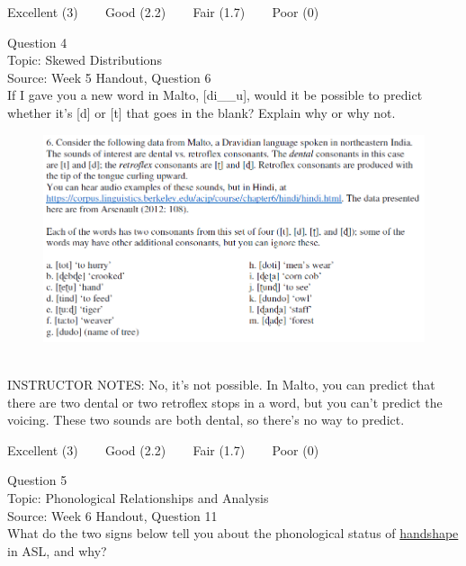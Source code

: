 \documentclass[12pt]{article}
\begin{document}
\vfill
Excellent (3) ~~~ Good (2.2) ~~~ Fair (1.7) ~~~ Poor (0)
\newpage

{\large Question 4}\\

Topic: Skewed Distributions\\
Source: Week 5 Handout, Question 6\\

If I gave you a new word in Malto, [di\_\_u], would it be possible to predict whether it's [d] or [t] that goes in the blank? Explain why or why not.\\

\begin{figure}[H]
\includegraphics{../images/malto.png}
\end{figure}

~\\
INSTRUCTOR NOTES: No, it's not possible. In Malto, you can predict that there are two dental or two retroflex stops in a word, but you can't predict the voicing. These two sounds are both dental, so there's no way to predict.


\vfill
Excellent (3) ~~~ Good (2.2) ~~~ Fair (1.7) ~~~ Poor (0)
\newpage

{\large Question 5}\\

Topic: Phonological Relationships and Analysis\\
Source: Week 6 Handout, Question 11\\

What do the two signs below tell you about the phonological status of \underline{handshape} in ASL, and why?\\
\end{document}
